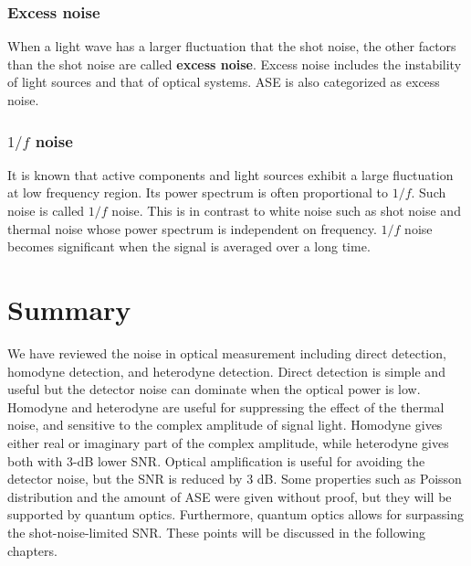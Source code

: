 \subsubsection{Excess noise}
When a light wave has a larger fluctuation that the shot noise, the other factors than the shot noise are called \textbf{excess noise}. Excess noise includes the instability of light sources and that of optical systems. ASE is also categorized as excess noise.

\subsubsection{$1/f$ noise}
It is known that active components and light sources exhibit a large fluctuation at low frequency region. Its power spectrum is often proportional to $1/f$. Such noise is called $1/f$ noise. This is in contrast to white noise such as shot noise and thermal noise whose power spectrum is independent on frequency. $1/f$ noise becomes significant when the signal is averaged over a long time.

\section{Summary}
We have reviewed the noise in optical measurement including direct detection, homodyne detection, and heterodyne detection. Direct detection is simple and useful but the detector noise can dominate when the optical power is low. Homodyne and heterodyne are useful for suppressing the effect of the thermal noise, and sensitive to the complex amplitude of signal light. Homodyne gives either real or imaginary part of the complex amplitude, while heterodyne gives both with 3-dB lower SNR. Optical amplification is useful for avoiding the detector noise, but the SNR is reduced by 3 dB. Some properties such as Poisson distribution and the amount of ASE were given without proof, but they will be supported by quantum optics. Furthermore, quantum optics allows for surpassing the shot-noise-limited SNR. These points will be discussed in the following chapters.

